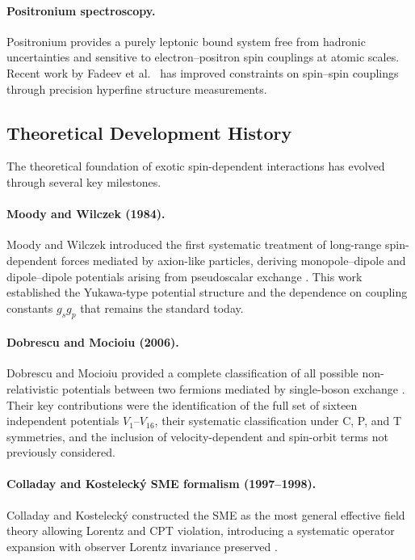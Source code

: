 \documentclass[main]{subfiles}
\begin{document}
\paragraph{Positronium spectroscopy.}
Positronium provides a purely leptonic bound system free from hadronic
uncertainties and sensitive to electron--positron spin couplings at atomic
scales. Recent work by Fadeev et al.\ \cite{Fadeev2022} has improved
constraints on spin--spin couplings through precision hyperfine structure
measurements.

\subsection{Theoretical Development History}

The theoretical foundation of exotic spin-dependent interactions has evolved
through several key milestones.

\paragraph{Moody and Wilczek (1984).}
Moody and Wilczek introduced the first systematic treatment of long-range
spin-dependent forces mediated by axion-like particles, deriving monopole--dipole
and dipole--dipole potentials arising from pseudoscalar exchange \cite{MoodyWilczek1984}.
This work established the Yukawa-type potential structure and the dependence on
coupling constants $g_{s}g_{p}$ that remains the standard today.

\paragraph{Dobrescu and Mocioiu (2006).}
Dobrescu and Mocioiu provided a complete classification of all possible
non-relativistic potentials between two fermions mediated by single-boson
exchange \cite{Dobrescu2006}. Their key contributions were the identification of
the full set of sixteen independent potentials $V_{1}$--$V_{16}$, their
systematic classification under C, P, and T symmetries, and the inclusion of
velocity-dependent and spin-orbit terms not previously considered.

\paragraph{Colladay and Kosteleck\'{y} SME formalism (1997--1998).}
Colladay and Kosteleck\'{y} constructed the SME as the most general effective
field theory allowing Lorentz and CPT violation, introducing a systematic
operator expansion with observer Lorentz invariance preserved
\cite{Colladay1997,Colladay1998}.
\end{document}
